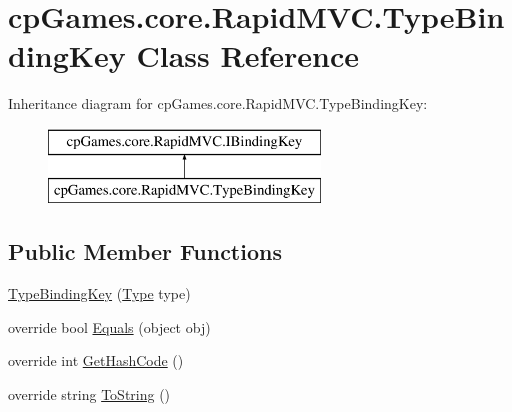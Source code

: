 \hypertarget{classcp_games_1_1core_1_1_rapid_m_v_c_1_1_type_binding_key}{}\section{cp\+Games.\+core.\+Rapid\+M\+V\+C.\+Type\+Binding\+Key Class Reference}
\label{classcp_games_1_1core_1_1_rapid_m_v_c_1_1_type_binding_key}
Inheritance diagram for cp\+Games.\+core.\+Rapid\+M\+V\+C.\+Type\+Binding\+Key\+:\begin{figure}[H]
\begin{center}
\leavevmode
\includegraphics[height=2.000000cm]{classcp_games_1_1core_1_1_rapid_m_v_c_1_1_type_binding_key}
\end{center}
\end{figure}
\subsection*{Public Member Functions}
\begin{DoxyCompactItemize}
\item 
\mbox{\hyperlink{classcp_games_1_1core_1_1_rapid_m_v_c_1_1_type_binding_key_a37a31860d5b1467370a4491d4a1d8232}{Type\+Binding\+Key}} (\mbox{\hyperlink{classcp_games_1_1core_1_1_rapid_m_v_c_1_1_type_binding_key_a2607ca6b5f825138867c84fb68fb159e}{Type}} type)
\item 
override bool \mbox{\hyperlink{classcp_games_1_1core_1_1_rapid_m_v_c_1_1_type_binding_key_a72bf6dd640ba88180b92a4533b9417eb}{Equals}} (object obj)
\item 
override int \mbox{\hyperlink{classcp_games_1_1core_1_1_rapid_m_v_c_1_1_type_binding_key_a552e27bb7189f8203afb967958032695}{Get\+Hash\+Code}} ()
\item 
override string \mbox{\hyperlink{classcp_games_1_1core_1_1_rapid_m_v_c_1_1_type_binding_key_a4f28fb3ba3a6236fe700e2f65e1d7e33}{To\+String}} ()
\end{DoxyCompactItemize}
